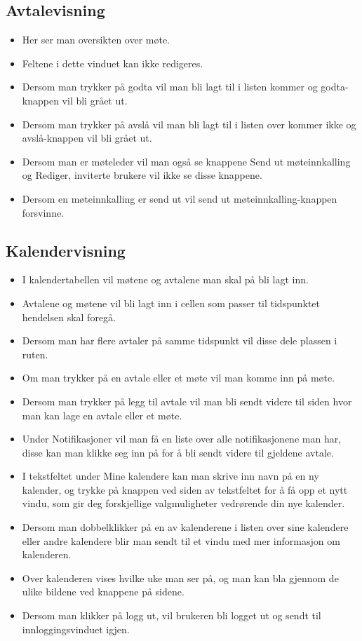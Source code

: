 \subsection{Avtalevisning}
\begin{itemize}
\item Her ser man oversikten over møte.
\item Feltene i dette vinduet kan ikke redigeres.
\item Dersom man trykker på godta vil man bli lagt til i listen kommer og godta-knappen vil bli grået ut.
\item Dersom man trykker på avslå vil man bli lagt til i listen over kommer ikke og avslå-knappen vil bli grået ut.
\item Dersom man er møteleder vil man også se knappene Send ut møteinnkalling og Rediger, inviterte brukere vil ikke se disse knappene.
\item Dersom en møteinnkalling er send ut vil send ut møteinnkalling-knappen forsvinne.
\end{itemize}

\subsection{Kalendervisning}
\begin{itemize}
\item I kalendertabellen vil møtene og avtalene man skal på bli lagt inn.
\item Avtalene og møtene vil bli lagt inn i cellen som passer til tidspunktet hendelsen skal foregå.
\item Dersom man har flere avtaler på samme tidspunkt vil disse dele plassen i ruten.
\item Om man trykker på en avtale eller et møte vil man komme inn på møte.
\item Dersom man trykker på legg til avtale vil man bli sendt videre til siden hvor man kan lage en avtale eller et møte.
\item Under Notifikasjoner vil man få en liste over alle notifikasjonene man har, disse kan man klikke seg inn på for å bli sendt videre til gjeldene avtale.
\item I tekstfeltet under Mine kalendere kan man skrive inn navn på en ny kalender, og trykke på knappen ved siden av tekstfeltet for å få opp et nytt vindu, som gir deg forskjellige valgmuligheter vedrørende din nye kalender.
\item Dersom man dobbelklikker på en av kalenderene i listen over sine kalendere eller andre kalendere blir man sendt til et vindu med mer informasjon om kalenderen.
\item Over kalenderen vises hvilke uke man ser på, og man kan bla gjennom de ulike bildene ved knappene på sidene.
\item Dersom man klikker på logg ut, vil brukeren bli logget ut og sendt til innloggingsvinduet igjen.
\end{itemize}

